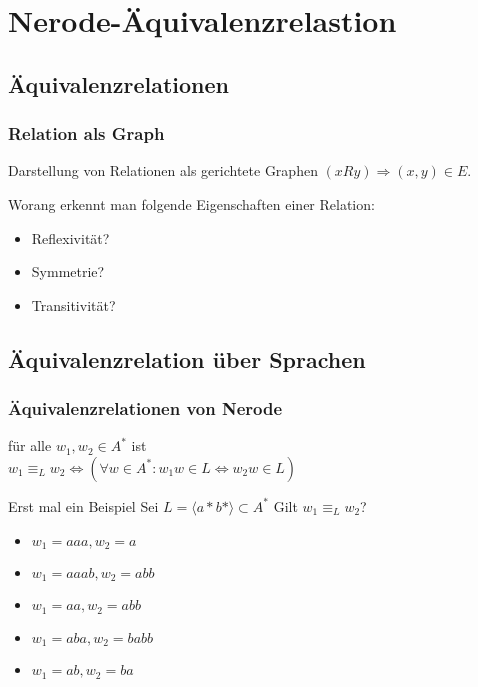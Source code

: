 \section{Nerode-Äquivalenzrelastion}
\subsection{Äquivalenzrelationen}
\begin{frame}
  \frametitle{Relation als Graph}
    Darstellung von Relationen als gerichtete Graphen $(xRy) \Rightarrow (x, y) \in E$.
    \begin{exampleblock}{Worang erkennt man folgende Eigenschaften einer Relation:}
      \begin{itemize}
        \item Reflexivität?
        \item Symmetrie?
        \item Transitivität?
      \end{itemize}
    \end{exampleblock}
\end{frame}

\subsection{Äquivalenzrelation über Sprachen}
\begin{frame}
  \frametitle{Äquivalenzrelationen von Nerode}
  \begin{definition}
  	für alle $w_1,w_2 \in A^*$ ist\\
  	$w_1 \equiv_L w_2 \Leftrightarrow (\forall w \in A^*: w_1w \in L \Leftrightarrow w_2w \in L)$
  \end{definition}

  \begin{exampleblock}{Erst mal ein Beispiel}
    Sei $L = \langle a*b* \rangle \subset A^*$ Gilt $w_1 \equiv_L w_2$?
      \begin{itemize}
        \item $w_1 = aaa, w_2 = a$ 
        \item $w_1 = aaab, w_2 = abb$ 
        \item $w_1 = aa, w_2 = abb$ 
        \item $w_1 = aba, w_2 = babb$ 
        \item $w_1 = ab, w_2 = ba$ 
      \end{itemize}
   \end{exampleblock}
\end{frame}

